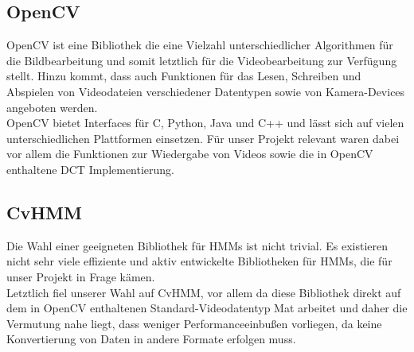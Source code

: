 \subsection{OpenCV}
\label{sec:opencv}
OpenCV ist eine Bibliothek die eine Vielzahl unterschiedlicher Algorithmen für die Bildbearbeitung und somit letztlich für die Videobearbeitung zur Verfügung stellt.
 Hinzu kommt, dass auch Funktionen für das Lesen, Schreiben und Abspielen von Videodateien verschiedener Datentypen sowie von Kamera-Devices angeboten werden.\\

OpenCV bietet Interfaces für C, Python, Java und C++ und lässt sich auf vielen unterschiedlichen Plattformen einsetzen.
 Für unser Projekt relevant waren dabei vor allem die Funktionen zur Wiedergabe von Videos sowie die in OpenCV enthaltene DCT Implementierung.


\subsection{CvHMM}
\label{sec:cvhmm}
Die Wahl einer geeigneten Bibliothek für HMMs ist nicht trivial.
 Es existieren nicht sehr viele effiziente und aktiv entwickelte Bibliotheken für HMMs, die für unser Projekt in Frage kämen.\\

Letztlich fiel unserer Wahl auf CvHMM, vor allem da diese Bibliothek direkt auf dem in OpenCV enthaltenen Standard-Videodatentyp Mat arbeitet und daher die Vermutung nahe liegt, dass weniger Performanceeinbußen vorliegen, da keine Konvertierung von Daten in andere Formate erfolgen muss.\\


